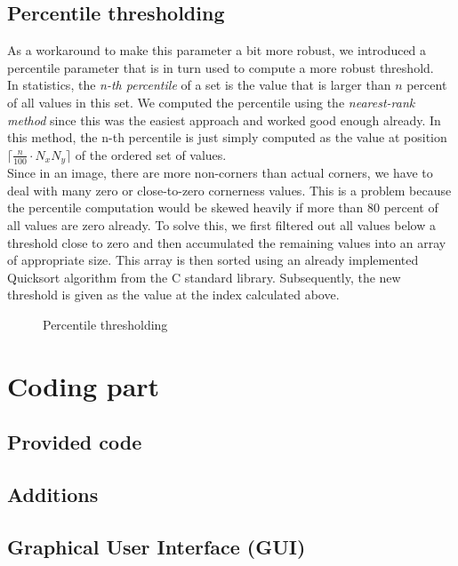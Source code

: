 \subsection{Percentile thresholding}\label{sub:Percentile}
 As a workaround to make this parameter a bit more robust, we introduced a percentile
parameter that is in turn used to compute a more robust threshold.\\
In statistics, the \textit{n-th percentile} of a set is the value that is larger than $n$ percent
of all values in this set.
We computed the percentile using the \textit{nearest-rank method} since this was the easiest
approach and worked good enough already. In this method, the n-th percentile is just simply
computed as the value at position $\lceil \frac{n}{100}\cdot N_xN_y\rceil$ of the ordered set of values.\\
Since in an image, there are more non-corners than actual corners, we have to deal with many zero
or close-to-zero cornerness values. This is a problem because the percentile computation would be skewed
heavily if more than 80 percent of all values are zero already. To solve this, we first filtered
out all values below a threshold close to zero and then accumulated the remaining values into an
array of appropriate size. This array is then sorted using an already implemented Quicksort
algorithm from the C standard library. Subsequently, the new threshold is given as the value at
the index calculated above.
\begin{figure}[ht]
    
    \caption{Percentile thresholding}
\end{figure}

\section{Coding part}
\subsection{Provided code}
\subsection{Additions}
\subsection{Graphical User Interface (GUI)}
